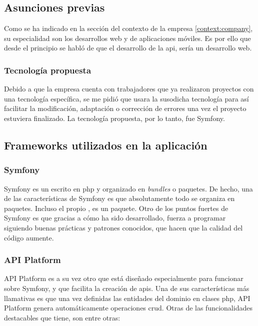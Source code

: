 \subsection{Asunciones previas}
Como se ha indicado en la sección del contexto de la empresa
\ref{context:company}, su especialidad son los desarrollos web y de
aplicaciones móviles. Es por ello que desde el principio se habló de que el
desarrollo de la \gls{api}, sería un desarrollo web.

\subsubsection{Tecnología propuesta}
Debido a que la empresa cuenta con trabajadores que ya realizaron proyectos con
una tecnología específica, se me pidió que usara la susodicha tecnología para
así facilitar la modificación, adaptación o corrección de errores una vez el
proyecto estuviera finalizado. La tecnología propuesta, por lo tanto, fue
Symfony.

\subsection{Frameworks utilizados en la aplicación}

\subsubsection{Symfony}
Symfony es un  escrito en \gls{php} y
organizado en \textit{bundles} o paquetes. De hecho, una de las
características de Symfony es que absolutamente todo se organiza en paquetes.
Incluso el propio , es un paquete. Otro de los
puntos fuertes de Symfony es que gracias a cómo ha sido desarrollado, fuerza a
programar siguiendo buenas prácticas y patrones conocidos, que hacen que la
calidad del código aumente.

\subsubsection{API Platform}
\label{tech:apiplat}
API Platform es a su vez otro  que está
diseñado especialmente para funcionar sobre Symfony, y que facilita la creación
de \gls{api}s. Una de sus características más llamativas es que una vez
definidas las entidades del dominio en clases \gls{php}, API Platform genera
automáticamente operaciones \gls{crud}. Otras de las funcionalidades destacables
que tiene, son entre otras:

